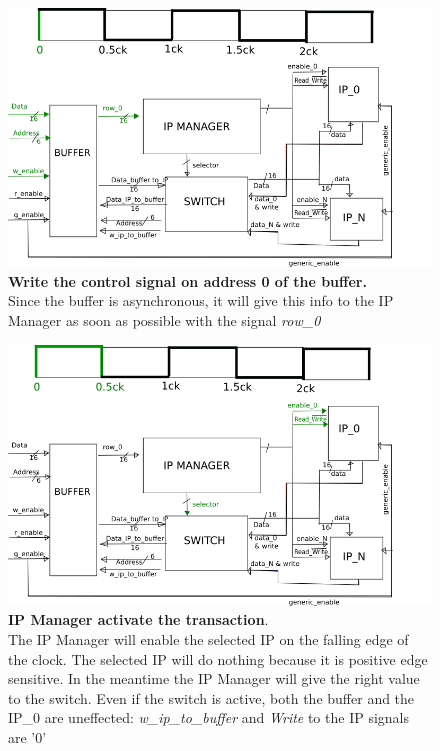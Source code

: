  \begin{figure}[h]
 	\centering
 	\includegraphics[scale=0.75]{chapters/figures/read_0.png}  
 	\caption{\textbf{Write the control signal on address 0 of the buffer.} \\Since the buffer is asynchronous, it will give this info to the IP Manager as soon as possible with the signal \textit{row\_0}}
 	\label{fig:0}
 \end{figure}
 
  \begin{figure}[h]
  	\centering
  	\includegraphics[scale=0.75]{chapters/figures/read_1.png}  
  	\caption{\textbf{IP Manager activate the transaction}. \\The IP Manager will enable the selected IP on the falling edge of the clock. The selected IP will do nothing because it is positive edge sensitive. In the meantime the IP Manager will give the right value to the switch. Even if the switch is active, both the buffer and the IP\_0 are uneffected: \textit{w\_ip\_to\_buffer} and\textit{ Write} to the IP signals are '0'}
  	\label{fig:1}
  \end{figure}
  
